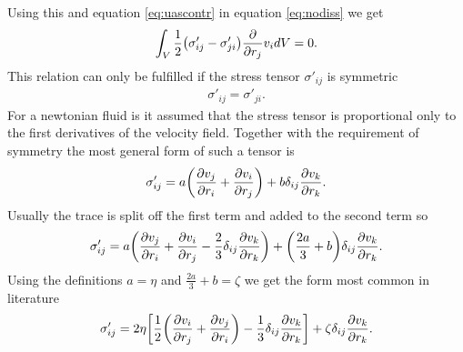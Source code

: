 Using this and equation \eqref{eq:uascontr} in equation \eqref{eq:nodiss} we get
\begin{align}
\int_V \frac{1}{2}\lra{\sigma'_{ij}-\sigma'_{ji}} \pd{r_j} v_i dV = 0.
\end{align}
This relation can only be fulfilled if the stress tensor $\sigma'_{ij}$
is symmetric
\begin{align}
\sigma'_{ij} = \sigma'_{ji}.
\end{align}
For a newtonian fluid is it assumed that the stress tensor is proportional only
to the first derivatives of the velocity field. Together with the requirement of
symmetry the most general form of such a tensor is
\begin{align}
\sigma'_{ij} = a\lra{\ppd{r_i}{v_j}+\ppd{r_j}{v_i}}+b \delta_{ij}\ppd{r_k}{v_k}.
\end{align}
Usually the trace is split off the first term and added to the second term so
\begin{align}
\sigma'_{ij} = a \lra{\ppd{r_i}{v_j}+\ppd{r_j}{v_i}
-\frac{2}{3}\delta_{ij}\ppd{r_k}{v_k}}+\lra{\frac{2
a}{3}+b}\delta_{ij}\ppd{r_k}{v_k}.
\end{align}
Using the definitions $a = \eta$ and $\frac{2 a}{3}+b=\zeta$ we get the form
most common in literature
\begin{align}
\sigma'_{ij} =  
2\eta\lrb{\frac{1}{2}\lra{\ppd{r_j}{v_i}+\ppd{r_i}{v_j}}
-\frac{1}{3}\delta_{ij}\ppd{r_k}{v_k}}
+\zeta \delta_{ij}\ppd{r_k}{v_k}.
\end{align}

